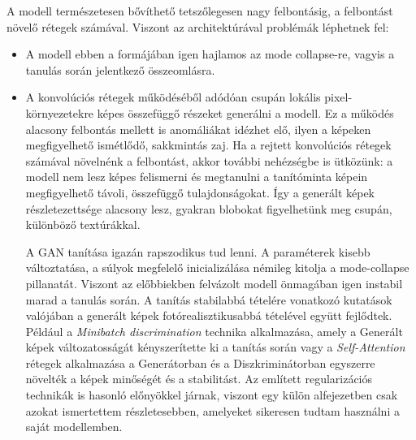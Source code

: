 A modell természetesen bővíthető tetszőlegesen nagy felbontásig, a felbontást növelő rétegek számával. Viszont az architektúrával problémák léphetnek fel:
\begin{itemize}
	\item A modell ebben a formájában igen hajlamos az mode collapse-re, vagyis a tanulás során jelentkező összeomlásra.
	\item A konvolúciós rétegek működéséből adódóan csupán lokális pixel-környezetekre képes összefüggő részeket generálni a modell.
	Ez a működés alacsony felbontás mellett is anomáliákat idézhet elő, ilyen a képeken megfigyelhető ismétlődő, sakkmintás zaj. Ha a rejtett konvolúciós rétegek számával növelnénk a felbontást, akkor további nehézségbe is ütközünk: a modell nem lesz képes felismerni és megtanulni a tanítóminta képein megfigyelhető távoli, összefüggő tulajdonságokat. Így a generált képek részletezettsége alacsony lesz, gyakran blobokat figyelhetünk meg csupán, különböző textúrákkal. \cite{salimans2016improved}

	A GAN tanítása igazán rapszodikus tud lenni. A paraméterek kisebb változtatása, a súlyok megfelelő inicializálása némileg kitolja a mode-collapse pillanatát. Viszont az előbbiekben felvázolt modell önmagában igen instabil marad a tanulás során. A tanítás stabilabbá tételére vonatkozó kutatások valójában a generált képek fotórealisztikusabbá tételével együtt fejlődtek. Például a \textit{Minibatch discrimination} \cite{salimans2016improved} technika alkalmazása, amely a Generált képek változatosságát kényszerítette ki a tanítás során vagy a \textit{Self-Attention} \cite{zhang2019self} rétegek alkalmazása a Generátorban és a Diszkriminátorban egyszerre növelték a képek minőségét és a stabilitást. Az említett regularizációs technikák is hasonló előnyökkel járnak, viszont egy külön alfejezetben csak azokat ismertettem részletesebben, amelyeket sikeresen tudtam használni a saját modellemben.
	

\end{itemize}
